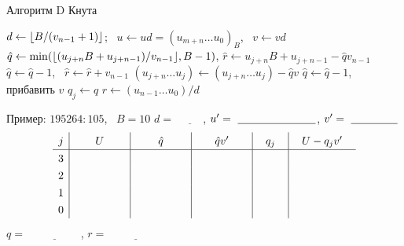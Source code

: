\documentclass{ca-slides}
\begin{document}
\begin{canvasframe}[shrink=14]{Алгоритм D Кнута}
  \small
  \begin{algorithmic}[1]
    \State $d \gets \lfloor B / (v_{n-1} + 1)\rfloor$; \ $u \gets ud = (u_{m+n} \dots u_0)_B$, \ $v \gets vd$
      \State $\hat q \gets \min(\lfloor(u_{j+n} B + u_{j+n-1}) / v_{n-1}\rfloor, B - 1)$,
        $\hat r \gets u_{j+n} B + u_{j+n-1} - \hat q v_{n-1}$ 
        \State $\hat q \gets \hat q - 1$, \ $\hat r \gets \hat r + v_{n-1}$
      \EndWhile
      \State $(u_{j+n} \dots u_j) \gets (u_{j+n} \dots u_j) - \hat q v$ 
       \State $\hat q \gets \hat q - 1$, прибавить $v$  \EndIf
      \State $q_j \gets \hat q$
    \EndFor
    \State $r \gets (u_{n-1} \dots u_0) / d$ 
  \end{algorithmic}
\end{canvasframe}

\begin{canvasframe}{Пример: $195264 : 105$, \ $B = 10$}
  $d = \ \underline{\hspace{1cm}}$, \quad $u' = \ \underline{\hspace{2.5cm}}$, \quad
  $v' = \ \underline{\hspace{1.5cm}}$
  \[
  \renewcommand{\arraystretch}{1.3}
  \begin{array}{c|c|c|c|c|c}
    j & U & \hat q & \hat q v' & q_j & U - q_j v' \\ \hline
    3 & \hspace{1.6cm} & \hspace{1.6cm} & \hspace{1.6cm} & \hspace{0.8cm} & \hspace{1.8cm}\\
    2 & & & & & \\
    1 & & & & & \\
    0 & & & & &
  \end{array}
  \]
  $q = \ \underline{\hspace{2cm}}$, \quad $r = \ \underline{\hspace{2cm}}$
\end{canvasframe}
\end{document}
